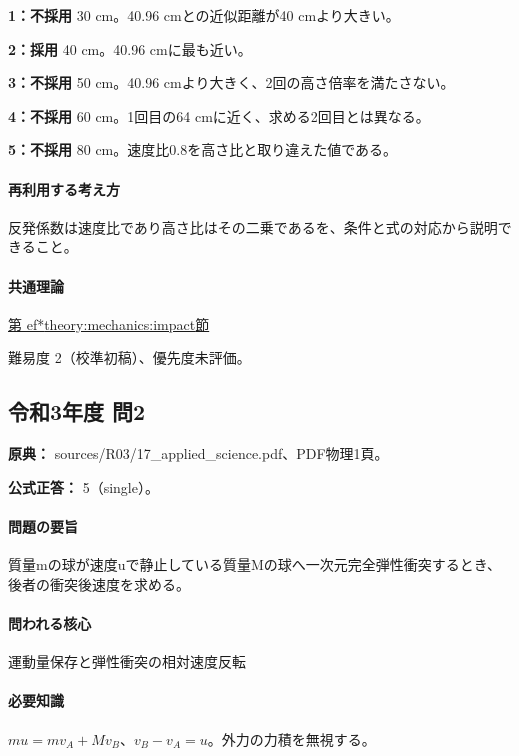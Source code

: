 \noindent\textbf{1：不採用} 30 cm。40.96 cmとの近似距離が40 cmより大きい。\par

\noindent\textbf{2：採用} 40 cm。40.96 cmに最も近い。\par

\noindent\textbf{3：不採用} 50 cm。40.96 cmより大きく、2回の高さ倍率を満たさない。\par

\noindent\textbf{4：不採用} 60 cm。1回目の64 cmに近く、求める2回目とは異なる。\par

\noindent\textbf{5：不採用} 80 cm。速度比0.8を高さ比と取り違えた値である。\par

\paragraph{再利用する考え方} 反発係数は速度比であり高さ比はその二乗であるを、条件と式の対応から説明できること。

\paragraph{共通理論} \hyperref[theory:mechanics:impact]{第
ef*{theory:mechanics:impact}節}

\par 難易度 2（校準初稿）、優先度未評価。

\subsection{令和3年度 問2}
\label{q:r03-reg-applied-02}

\noindent\textbf{原典：} sources/R03/17\_applied\_science.pdf、PDF物理1頁。

\textbf{公式正答：} 5（single）。

\paragraph{問題の要旨} 質量mの球が速度uで静止している質量Mの球へ一次元完全弾性衝突するとき、後者の衝突後速度を求める。

\paragraph{問われる核心} 運動量保存と弾性衝突の相対速度反転

\paragraph{必要知識} \(mu=mv_A+Mv_B\)、\(v_B-v_A=u\)。外力の力積を無視する。

